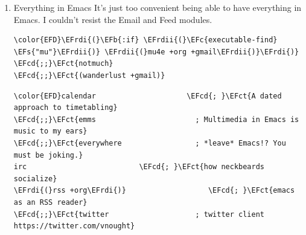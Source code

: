 \documentclass{scrartcl}
\newcommand{\EFs}[1]{\textcolor{EFs}{#1}} %
\newcommand{\EFb}[1]{\textcolor{EFb}{#1}} %
\newcommand{\EFct}[1]{\textcolor{EFct}{#1}} %
\newcommand{\EFc}[1]{\textcolor{EFc}{#1}} %
\newcommand{\EFcd}[1]{\textcolor{EFcd}{#1}} %
\newcommand{\EFrdi}[1]{#1} %
\newcommand{\EFrdii}[1]{#1} %
\begin{document}
\begin{enumerate}
\begin{Code}
\begin{Verbatim}[]
\EFcd{;;}\EFct{racket                     ; a DSL for DSLs}
\EFcd{;;}\EFct{raku                       ; the artist formerly known as perl6}
\EFcd{;;}\EFct{rest                       ; Emacs as a REST client}
\EFcd{;;}\EFct{rst                        ; ReST in peace}
\EFcd{;;}\EFct{(ruby +rails)              ; 1.step \{|i| p "Ruby is \#\{i.even? ? '}\textcolor[HTML]{a991f1}{love}\EFct{' : '}\textcolor[HTML]{a991f1}{life}\EFct{'\}"\}}
\EFrdi{(}rust +lsp\EFrdi{)}                  \EFcd{; }\EFct{Fe2O3.unwrap().unwrap().unwrap().unwrap()}
\EFcd{;;}\EFct{scala                      ; java, but good}
\EFcd{;;}\EFct{scheme                     ; a fully conniving family of lisps}
sh                           \EFcd{; }\EFct{she sells \{ba,z,fi\}sh shells on the C xor}
\EFcd{;;}\EFct{sml                        ; no, the /other/ ML}
\EFcd{;;}\EFct{solidity                   ; do you need a blockchain? No.}
\EFcd{;;}\EFct{swift                      ; who asked for emoji variables?}
\EFcd{;;}\EFct{terra                      ; Earth and Moon in alignment for performance.}
\EFcd{;;}\EFct{web                        ; the tubes}
\EFcd{;;}\EFct{yaml                       ; JSON, but readable}
\EFcd{;;}\EFct{zig                        ; C, but simpler}
\end{Verbatim}
\end{Code}

\item Everything in Emacs
\label{sec:orgc63986e}
It's just too convenient being able to have everything in Emacs.
I couldn't resist the Email and Feed modules.
\begin{Code}
\begin{Verbatim}[]
\color{EFD}\EFrdi{(}\EFb{:if} \EFrdii{(}\EFc{executable-find} \EFs{"mu"}\EFrdii{)} \EFrdii{(}mu4e +org +gmail\EFrdii{)}\EFrdi{)}
\EFcd{;;}\EFct{notmuch}
\EFcd{;;}\EFct{(wanderlust +gmail)}
\end{Verbatim}
\end{Code}

\begin{Code}
\begin{Verbatim}[]
\color{EFD}calendar                     \EFcd{; }\EFct{A dated approach to timetabling}
\EFcd{;;}\EFct{emms                       ; Multimedia in Emacs is music to my ears}
\EFcd{;;}\EFct{everywhere                 ; *leave* Emacs!? You must be joking.}
irc                          \EFcd{; }\EFct{how neckbeards socialize}
\EFrdi{(}rss +org\EFrdi{)}                   \EFcd{; }\EFct{emacs as an RSS reader}
\EFcd{;;}\EFct{twitter                    ; twitter client https://twitter.com/vnought}
\end{Verbatim}
\end{Code}
\end{enumerate}
\end{document}
